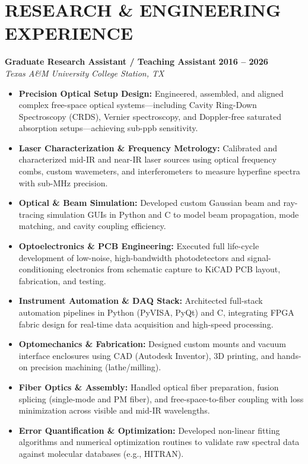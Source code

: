 \documentclass[a4paper,10pt]{extarticle}
\newcommand{\resumeentry}[4]{
	\noindent\textbf{#2} \hfill \textbf{#1}\\
	\textit{#3} \hfill \textit{#4}\\[0.2em]
}
\begin{document}
	\section*{RESEARCH \& ENGINEERING EXPERIENCE}
	
	\resumeentry{2016 -- 2026}{Graduate Research Assistant / Teaching Assistant}{Texas A\&M University}{College Station, TX}
	\begin{itemize}[leftmargin=1.2em, itemsep=0.2em]
		\item \textbf{Precision Optical Setup Design:} Engineered, assembled, and aligned complex free-space optical systems—including Cavity Ring-Down Spectroscopy (CRDS), Vernier spectroscopy, and Doppler-free saturated absorption setups—achieving sub-ppb sensitivity.
		\item \textbf{Laser Characterization \& Frequency Metrology:} Calibrated and characterized mid-IR and near-IR laser sources using optical frequency combs, custom wavemeters, and interferometers to measure hyperfine spectra with sub-MHz precision.
		\item \textbf{Optical \& Beam Simulation:} Developed custom Gaussian beam and ray-tracing simulation GUIs in Python and C to model beam propagation, mode matching, and cavity coupling efficiency.
		\item \textbf{Optoelectronics \& PCB Engineering:} Executed full life-cycle development of low-noise, high-bandwidth photodetectors and signal-conditioning electronics from schematic capture to KiCAD PCB layout, fabrication, and testing.
		\item \textbf{Instrument Automation \& DAQ Stack:} Architected full-stack automation pipelines in Python (PyVISA, PyQt) and C, integrating FPGA fabric design for real-time data acquisition and high-speed processing.
		\item \textbf{Optomechanics \& Fabrication:} Designed custom mounts and vacuum interface enclosures using CAD (Autodesk Inventor), 3D printing, and hands-on precision machining (lathe/milling).
		\item \textbf{Fiber Optics \& Assembly:} Handled optical fiber preparation, fusion splicing (single-mode and PM fiber), and free-space-to-fiber coupling with loss minimization across visible and mid-IR wavelengths.
		\item \textbf{Error Quantification \& Optimization:} Developed non-linear fitting algorithms and numerical optimization routines to validate raw spectral data against molecular databases (e.g., HITRAN).
	\end{itemize}
	
\end{document}
